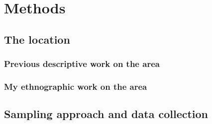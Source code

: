 \chapter{Methods}
  \section{The location}
    \subsection{Previous descriptive work on the area}
    \subsection{My ethnographic work on the area}
  \section{Sampling approach and data collection}
